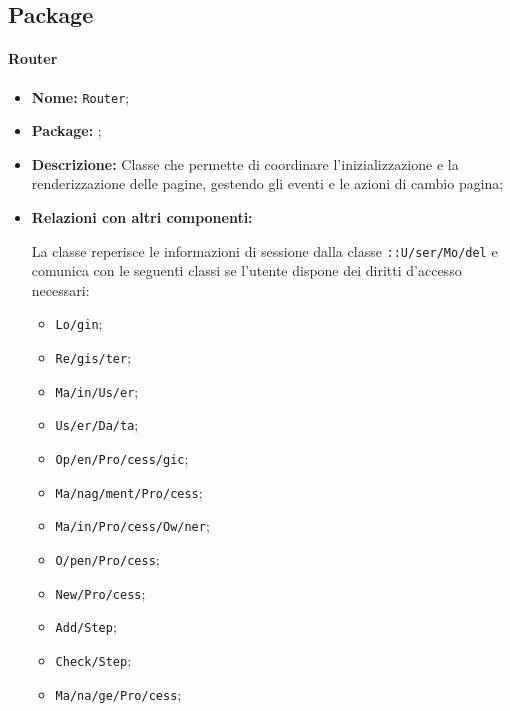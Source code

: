 \subsection{Package \logic{}}

\paragraph{Router}
\begin{flushleft}
\begin{itemize}
\item \textbf{Nome:} \texttt{Router};
\item \textbf{Package:} \texttt{\logic{}};
\item \textbf{Descrizione:} Classe che permette di coordinare l'inizializzazione e la renderizzazione delle pagine, gestendo gli eventi e le azioni di cambio pagina;
\item \textbf{Relazioni con altri componenti:}
\begin{sloppypar}
La classe reperisce le informazioni di sessione dalla classe \texttt{\model{}::U\fshyp{}ser\fshyp{}Mo\fshyp{}del} e comunica con le seguenti classi se l'utente dispone dei diritti d'accesso necessari:
\begin{itemize}
\item \texttt{\logic{}Lo\fshyp{}gin};
\item \texttt{\logicUser{}Re\fshyp{}gis\fshyp{}ter};
\item \texttt{\logicUser{}Ma\fshyp{}in\fshyp{}Us\fshyp{}er};
\item \texttt{\logicUser{}Us\fshyp{}er\fshyp{}Da\fshyp{}ta};
\item \texttt{\logicUser{}Op\fshyp{}en\fshyp{}Pro\fshyp{}cess\fshyp{}gic};
\item \texttt{\logicUser{}Ma\fshyp{}nag\fshyp{}ment\fshyp{}Pro\fshyp{}cess};
\item \texttt{\logicAdmin{}Ma\fshyp{}in\fshyp{}Pro\fshyp{}cess\fshyp{}Ow\fshyp{}ner};
\item \texttt{\logicAdmin{}O\fshyp{}pen\fshyp{}Pro\fshyp{}cess};
\item \texttt{\logicAdmin{}New\fshyp{}Pro\fshyp{}cess};
\item \texttt{\logicAdmin{}Add\fshyp{}Step};
\item \texttt{\logicAdmin{}Check\fshyp{}Step};
\item \texttt{\logicAdmin{}Ma\fshyp{}na\fshyp{}ge\fshyp{}Pro\fshyp{}cess};
\end{itemize}
\end{sloppypar}
\end{itemize}
\end{flushleft}

